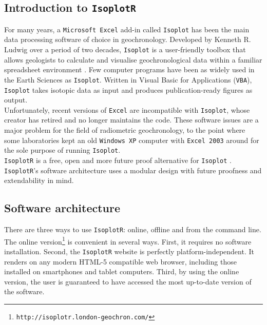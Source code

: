 \begin{refsection}
\chapter{Introduction to \texttt{IsoplotR}}
\label{ch:intro2IsoplotR}
  
For many years, a \texttt{Microsoft Excel} add-in called
\texttt{Isoplot} has been the main data processing software of choice
in geochronology. Developed by Kenneth R. Ludwig over a period of two
decades, \texttt{Isoplot} is a user-friendly toolbox that allows
geologists to calculate and visualise geochronological data within a
familiar spreadsheet environment \citep{ludwig1988, ludwig1999,
  ludwig2003, ludwig2012}.  Few computer programs have been as widely
used in the Earth Sciences as \texttt{Isoplot}. Written in Visual
Basic for Applications (\texttt{VBA}), \texttt{Isoplot} takes isotopic
data as input and produces publication-ready figures as output.\\

Unfortunately, recent versions of \texttt{Excel} are incompatible with
\texttt{Isoplot}, whose creator has retired and no longer maintains
the code. These software issues are a major problem for the field of
radiometric geochronology, to the point where some laboratories kept
an old \texttt{Windows~XP} computer with \texttt{Excel~2003} around
for the sole purpose of running \texttt{Isoplot}.\\

\texttt{IsoplotR} is a free, open and more future proof alternative
for \texttt{Isoplot} \citep{vermeesch2018c}.  \texttt{IsoplotR}'s
software architecture uses a modular design with future proofness and
extendability in mind.

\section{Software architecture}
\label{sec:architecture}

There are three ways to use \texttt{IsoplotR}: online, offline and
from the command line.\\

The online
version\footnote{\texttt{http://isoplotr.london-geochron.com/}} is
convenient in several ways. First, it requires no software
installation. Second, the \texttt{IsoplotR} website is perfectly
platform-independent. It renders on any modern HTML-5 compatible web
browser, including those installed on smartphones and tablet
computers. Third, by using the online version, the user is guaranteed
to have accessed the most up-to-date version of the software.\\


\end{refsection}
